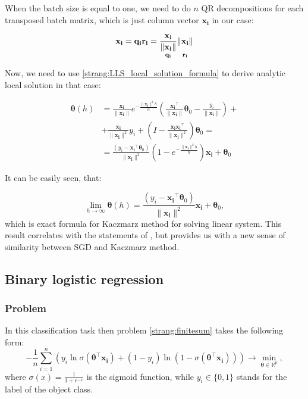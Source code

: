 \documentclass{article}
\newcommand{\vect}[1]{\boldsymbol{\mathbf{#1}}}
\begin{document}
When the batch size is equal to one, we need to do $n$ QR decompositions for each transposed batch matrix, which is just column vector $\vect{x_i}$ in our case:

\begin{equation}
\vect{x_i} = \vect{q_i} \vect{r_i} = \underset{\vect{q_i} }{\frac{\vect{x_i}}{\|\vect{x_i}\|}} \underset{\vect{r_i}}{\vphantom{\frac{\vect{x_i}}{\|\vect{x_i}\|}} \|\vect{x_i}\|}
\end{equation}

Now, we need to use \eqref{strang:LLS_local_solution_formula} to derive analytic local solution in that case:

\begin{equation*}
\begin{split}
\vect{\theta}(h) &= \frac{\vect{x_i}}{\|\vect{x_i}\|} e^{-\frac{\|\vect{x_i}\|^2 h}{n}} \left( \frac{\vect{x_i}^\top}{\|\vect{x_i}\|} \vect{\theta}_0 - \frac{y_i}{\|\vect{x_i}\|}\right) + \\ &+ \frac{\vect{x_i}}{\|\vect{x_i}\|^2}y_i + \left(I - \frac{\vect{x_i}\vect{x_i}^\top}{\|\vect{x_i}\|^2}\right)\vect{\theta}_0 = \\
&= \frac{\left(y_i -\vect{x_i}^\top\vect{\theta}_0 \right)}{\|\vect{x_i}\|^2}  \left(1 - e^{-\frac{\|\vect{x_i}\|^2 h}{n}}\right)\vect{x_i} + \vect{\theta}_0
\end{split}
\end{equation*}

It can be easily seen, that:

\begin{equation}
\label{strang:splitting_limit_kaczmarz}
\lim_{h \to \infty} \vect{\theta}(h) = \frac{\left(y_i - \vect{x_i}^\top\vect{\theta}_0 \right)}{\|\vect{x_i}\|^2} \vect{x_i} + \vect{\theta}_0,
\end{equation}
which is exact formula for Kaczmarz method for solving linear system. This result correlates with the statements of \cite{needell2014stochastic}, but provides us with a new sense of similarity between SGD and Kaczmarz method.

\subsection{Binary logistic regression}
\subsubsection{Problem}
In this classification task then problem \eqref{strang:finitesum} takes the following form:
\begin{equation}\label{strang:LogReg}
-\frac{1}{n} \sum_{i=1}^n\left(y_i \ln \sigma(\vect{\theta}^\top\vect{x_i})  + (1-y_i) \ln (1-\sigma(\vect{\theta}^\top\vect{x_i}))\right) \to \min_{\vect{\theta} \in \mathbb{R}^p},
\end{equation}
where $\sigma(x) = \frac{1}{1 + e^{-x}}$ is the sigmoid function, while $ y_i \in \{0,1\}$ stands for the label of the object class.
\end{document}
